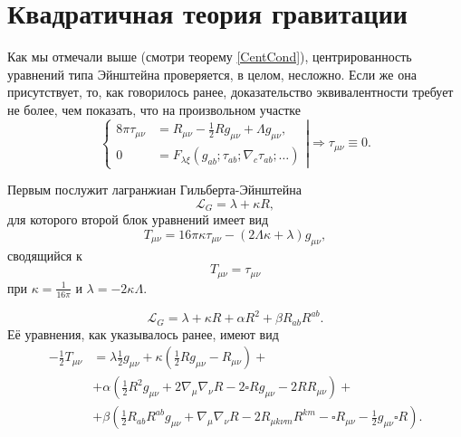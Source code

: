 \documentclass[a4paper, 14pt]{scrarticle}
\theoremstyle{Imperial}
\begin{document}
	\section{Квадратичная теория гравитации}
	
	Как мы отмечали выше (смотри теорему \ref{CentCond}), центрированность уравнений типа Эйнштейна проверяется, в целом, несложно. Если же она присутствует, то, как говорилось ранее, доказательство эквивалентности требует не более, чем показать, что на произвольном участке
	$$\left\lbrace\begin{aligned}
		8\pi \tau_{\mu\nu} &= R_{\mu\nu} - \frac{1}{2} R g_{\mu\nu} + \Lambda g_{\mu\nu},\\
		0 &= F_{\lambda\xi} \left( g_{ab}; \tau_{ab}; \nabla_c \tau_{ab}; \dots \right)
	\end{aligned}\right| 
	\Rightarrow
	\tau_{\mu\nu} \equiv 0.$$

	
	Первым послужит лагранжиан Гильберта-Эйнштейна
	$$\mathcal{L}_G = \lambda + \kappa R,$$
	для которого второй блок уравнений имеет вид
	$$T_{\mu\nu} = 16\pi\kappa\tau_{\mu\nu} - \left(2\Lambda\kappa+\lambda\right)g_{\mu\nu},$$
	сводящийся к 
	$$T_{\mu\nu} = \tau_{\mu\nu}$$
	при $\kappa = \frac{1}{16\pi}$ и $\lambda = -2\kappa\Lambda$.
	
	$$\mathcal{L}_G = \lambda + \kappa R + \alpha R^2 + \beta R_{ab}R^{ab}.$$
	Её уравнения, как указывалось ранее, имеют вид
	$$\begin{aligned}
		-\frac{1}{2}T_{\mu\nu} &=\lambda\frac{1}{2}g_{\mu\nu}+\kappa\left(\frac{1}{2}Rg_{\mu\nu}-R_{\mu\nu}\right)+\\
		&+\alpha\left(\frac{1}{2}R^{2}g_{\mu\nu}+2\nabla_{\mu}\nabla_{\nu}R-2\square Rg_{\mu\nu}-2RR_{\mu\nu}\right)+\\	
		&+\beta\left(\frac{1}{2}R_{ab}R^{ab}g_{\mu\nu}+\nabla_{\mu}\nabla_{\nu}R-2R_{\mu k\nu m}R^{km}-\square R_{\mu\nu}-\frac{1}{2}g_{\mu\nu}\square R\right).
	\end{aligned}$$
\end{document}
